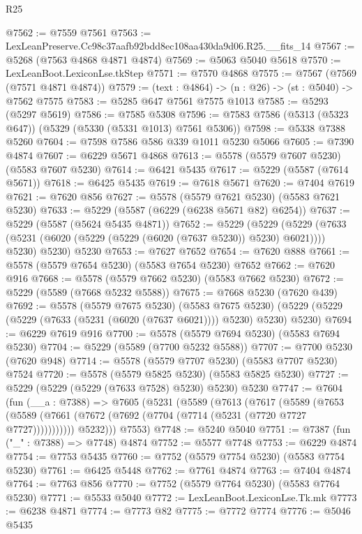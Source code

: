 \begin{lexlean}{R25}
\begin{coremodule}
@7562 := @7559 @7561
@7563 := LexLeanPreserve.Cc98c37aafb92bdd8ec108aa430da9d06.R25.__fits_14
@7567 := @5268 (@7563 @4868 @4871 @4874)
@7569 := @5063 @5040 @5618
@7570 := LexLeanBoot.LexiconLse.tkStep
@7571 := @7570 @4868
@7575 := @7567 (@7569 (@7571 @4871 @4874))
@7579 := (text : @4864) -> (n : @26) -> (st : @5040) -> @7562 @7575
@7583 := @5285 @647 @7561 @7575 @1013
@7585 := @5293 (@5297 @5619)
@7586 := @7585 @5308
@7596 := @7583 @7586 (@5313 (@5323 @647)) (@5329 (@5330 (@5331 @1013) @7561 @5306))
@7598 := @5338 @7388 @5260
@7604 := @7598 @7586 @586 @339 @1011 @5230 @5066
@7605 := @7390 @4874
@7607 := @6229 @5671 @4868
@7613 := @5578 (@5579 @7607 @5230) (@5583 @7607 @5230)
@7614 := @6421 @5435
@7617 := @5229 (@5587 (@7614 @5671))
@7618 := @6425 @5435
@7619 := @7618 @5671
@7620 := @7404 @7619
@7621 := @7620 @856
@7627 := @5578 (@5579 @7621 @5230) (@5583 @7621 @5230)
@7633 := @5229 (@5587 (@6229 (@6238 @5671 @82) @6254))
@7637 := @5229 (@5587 (@5624 @5435 @4871))
@7652 := @5229
    (@5229
      (@5229 (@7633 (@5231 (@6020 (@5229 (@5229 (@6020 (@7637 @5230)) @5230) @6021)))) @5230)
      @5230)
    @5230
@7653 := @7627 @7652
@7654 := @7620 @888
@7661 := @5578 (@5579 @7654 @5230) (@5583 @7654 @5230) @7652
@7662 := @7620 @916
@7668 := @5578 (@5579 @7662 @5230) (@5583 @7662 @5230)
@7672 := @5229 (@5589 (@7668 @5232 @5588))
@7675 := @7668 @5230 (@7620 @439)
@7692 := @5578
    (@5579 @7675 @5230)
    (@5583 @7675 @5230)
    (@5229 (@5229 (@5229 (@7633 (@5231 (@6020 (@7637 @6021)))) @5230) @5230) @5230)
@7694 := @6229 @7619 @916
@7700 := @5578 (@5579 @7694 @5230) (@5583 @7694 @5230)
@7704 := @5229 (@5589 (@7700 @5232 @5588))
@7707 := @7700 @5230 (@7620 @948)
@7714 := @5578 (@5579 @7707 @5230) (@5583 @7707 @5230) @7524
@7720 := @5578 (@5579 @5825 @5230) (@5583 @5825 @5230)
@7727 := @5229 (@5229 (@5229 (@7633 @7528) @5230) @5230) @5230
@7747 := @7604
    (fun (__a : @7388) =>
    @7605
      (@5231
        (@5589
          (@7613
            (@7617
              (@5589
                (@7653
                  (@5589 (@7661 (@7672 (@7692 (@7704 (@7714 (@5231 (@7720 @7727 @7727)))))))))))
            @5232)))
      @7553)
@7748 := @5240 @5040
@7751 := @7387 (fun ("_" : @7388) => @7748) @4874
@7752 := @5577 @7748
@7753 := @6229 @4874
@7754 := @7753 @5435
@7760 := @7752 (@5579 @7754 @5230) (@5583 @7754 @5230)
@7761 := @6425 @5448
@7762 := @7761 @4874
@7763 := @7404 @4874
@7764 := @7763 @856
@7770 := @7752 (@5579 @7764 @5230) (@5583 @7764 @5230)
@7771 := @5533 @5040
@7772 := LexLeanBoot.LexiconLse.Tk.mk
@7773 := @6238 @4871
@7774 := @7773 @82
@7775 := @7772 @7774
@7776 := @5046 @5435

\end{coremodule}
\end{lexlean}
